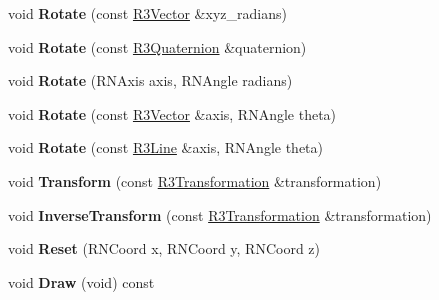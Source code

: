 \begin{DoxyCompactItemize}
\item 
void {\bfseries Rotate} (const \hyperlink{class_r3_vector}{R3\+Vector} \&xyz\+\_\+radians)\hypertarget{class_r3_point_a739ff68aadd97d70d6f92312e041b300}{}\label{class_r3_point_a739ff68aadd97d70d6f92312e041b300}

\item 
void {\bfseries Rotate} (const \hyperlink{class_r3_quaternion}{R3\+Quaternion} \&quaternion)\hypertarget{class_r3_point_a0b871a99c6195953014af16dc5c080dc}{}\label{class_r3_point_a0b871a99c6195953014af16dc5c080dc}

\item 
void {\bfseries Rotate} (R\+N\+Axis axis, R\+N\+Angle radians)\hypertarget{class_r3_point_a726139a90f973fe779efa0263300295f}{}\label{class_r3_point_a726139a90f973fe779efa0263300295f}

\item 
void {\bfseries Rotate} (const \hyperlink{class_r3_vector}{R3\+Vector} \&axis, R\+N\+Angle theta)\hypertarget{class_r3_point_acd4501075844749aae9e4cd5b3c94c0e}{}\label{class_r3_point_acd4501075844749aae9e4cd5b3c94c0e}

\item 
void {\bfseries Rotate} (const \hyperlink{class_r3_line}{R3\+Line} \&axis, R\+N\+Angle theta)\hypertarget{class_r3_point_af63c08a8dc31279281342a1552e1504d}{}\label{class_r3_point_af63c08a8dc31279281342a1552e1504d}

\item 
void {\bfseries Transform} (const \hyperlink{class_r3_transformation}{R3\+Transformation} \&transformation)\hypertarget{class_r3_point_ae4dac4ed21c59ef1bc606d0f8e852456}{}\label{class_r3_point_ae4dac4ed21c59ef1bc606d0f8e852456}

\item 
void {\bfseries Inverse\+Transform} (const \hyperlink{class_r3_transformation}{R3\+Transformation} \&transformation)\hypertarget{class_r3_point_a64811762851c6d270ce43327f4c8228a}{}\label{class_r3_point_a64811762851c6d270ce43327f4c8228a}

\item 
void {\bfseries Reset} (R\+N\+Coord x, R\+N\+Coord y, R\+N\+Coord z)\hypertarget{class_r3_point_afa30ad6e664ef97b987af713c6ab4b7e}{}\label{class_r3_point_afa30ad6e664ef97b987af713c6ab4b7e}

\item 
void {\bfseries Draw} (void) const \hypertarget{class_r3_point_af91562573df24e58cf67c0ebe226156f}{}\label{class_r3_point_af91562573df24e58cf67c0ebe226156f}


\end{DoxyCompactItemize}
